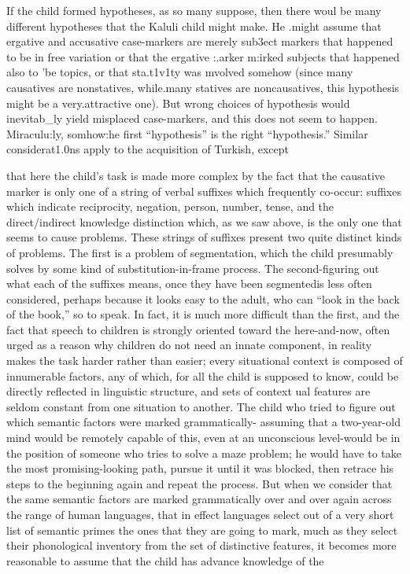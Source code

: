 If the child formed hypotheses, as so many suppose, then there woul be many different hypotheses that the Kaluli child might make. He .might assume that ergative and accusative case-markers are merely sub3ect markers that happened to be in free variation or that the ergative :{\textquotedbl}.arker m:irked subjects that happened also to 'be topics, or that sta.t1v1ty was mvolved somehow (since many causatives are non\-statives, while.many statives are noncausatives, this hypothesis might be a very.attractive one). But wrong choices of hypothesis would inevit\-ab\_ly yield misplaced case-markers, and this does not seem to happen. Miraculu:ly, somhow:he first ``hypothesis'' is the right ``hypothesis.'' Similar considerat1.0ns apply to the acquisition of Turkish, except


that here the child's task is made more complex by the fact that the causative marker is only one of a string of verbal suffixes which fre\-quently co-occur: suffixes which indicate reciprocity, negation, person, number, tense, and the direct/indirect knowledge distinction which, as we saw above, is the only one that seems to cause problems. These strings of suffixes present two quite distinct kinds of problems. The first is a problem of segmentation, which the child presumably solves by some kind of substitution-in-frame process. The second-figuring out what each of the suffixes means, once they have been segmented\-is less often considered, perhaps because it looks easy to the adult, who can ``look in the back of the book,'' so to speak. In fact, it is much more difficult than the first, and the fact that speech to children is strongly oriented toward the here-and-now, often urged as a reason why children do not need an innate component, in reality makes the task harder rather than easier; every situational context is composed of innumerable factors, any of which, for all the child is supposed to know, could be directly reflected in linguistic structure, and sets of context ual features are seldom constant from one situation to another. The child who tried to figure out which semantic factors were marked grammatically- assuming that a two-year-old mind would be remotely capable of this, even at an unconscious level-would be in the position of someone who tries to solve a maze problem; he would have to take the most promising-looking path, pursue it until it was blocked, then retrace his steps to the beginning again and repeat the process. But when we consider that the same semantic factors are marked gram\-matically over and over again across the range of human languages, that in effect languages select out of a very short list of semantic primes the ones that they are going to mark, much as they select their phonological inventory from the set of distinctive features, it becomes more reasonable to assume that the child has advance knowledge of the

